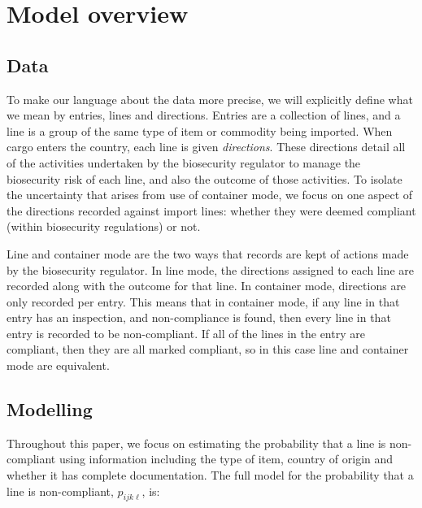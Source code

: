 \documentclass[aoas]{imsart}
\begin{document}
\section{Model overview}
\subsection{Data}\label{sec:data}

To make our language about the data more precise, we will explicitly define what we mean by entries, lines and directions. Entries are a collection of lines, and a line is a group of the same type of item or commodity being imported. When cargo enters the country, each line is given \emph{directions}. These directions detail all of the activities undertaken by the biosecurity regulator to manage the biosecurity risk of each line, and also the outcome of those activities.  {To isolate the uncertainty that arises from use of container mode, we focus on one aspect of the directions recorded against import lines: whether they were deemed compliant (within biosecurity regulations) or not.}

 {Line and container mode are the two ways that records are kept of actions made by the biosecurity regulator.} In line mode, the directions assigned to each line are recorded along with the outcome for that line. In container mode, directions are only recorded per entry. This means that in container mode, if any line in that entry has an inspection, and non-compliance is found, then every line in that entry is recorded to be non-compliant. If all of the lines in the entry are compliant, then they are all marked compliant, so in this case line and container mode are equivalent.

\subsection{Modelling}\label{sec:model}

Throughout this paper, we focus on estimating the probability that a line is non-compliant using information including the type of item, country of origin and whether it has complete documentation. The full model for the probability that a line is non-compliant, \(p_{ijk\ell}\), is: 
\end{document}
